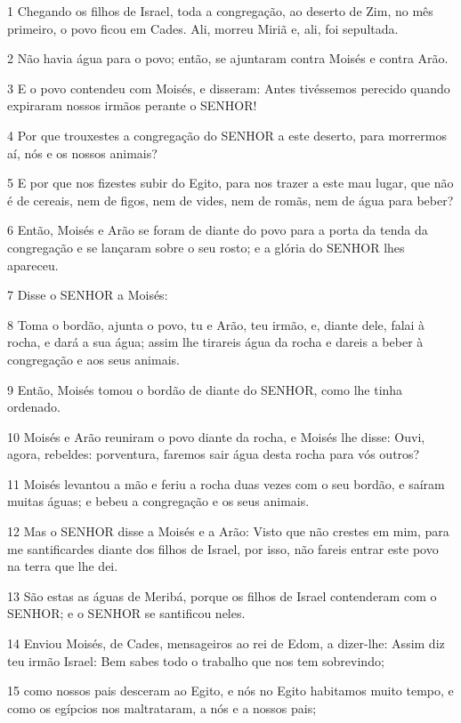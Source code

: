 \par 1 Chegando os filhos de Israel, toda a congregação, ao deserto de Zim, no mês primeiro, o povo ficou em Cades. Ali, morreu Miriã e, ali, foi sepultada.
\par 2 Não havia água para o povo; então, se ajuntaram contra Moisés e contra Arão.
\par 3 E o povo contendeu com Moisés, e disseram: Antes tivéssemos perecido quando expiraram nossos irmãos perante o SENHOR!
\par 4 Por que trouxestes a congregação do SENHOR a este deserto, para morrermos aí, nós e os nossos animais?
\par 5 E por que nos fizestes subir do Egito, para nos trazer a este mau lugar, que não é de cereais, nem de figos, nem de vides, nem de romãs, nem de água para beber?
\par 6 Então, Moisés e Arão se foram de diante do povo para a porta da tenda da congregação e se lançaram sobre o seu rosto; e a glória do SENHOR lhes apareceu.
\par 7 Disse o SENHOR a Moisés:
\par 8 Toma o bordão, ajunta o povo, tu e Arão, teu irmão, e, diante dele, falai à rocha, e dará a sua água; assim lhe tirareis água da rocha e dareis a beber à congregação e aos seus animais.
\par 9 Então, Moisés tomou o bordão de diante do SENHOR, como lhe tinha ordenado.
\par 10 Moisés e Arão reuniram o povo diante da rocha, e Moisés lhe disse: Ouvi, agora, rebeldes: porventura, faremos sair água desta rocha para vós outros?
\par 11 Moisés levantou a mão e feriu a rocha duas vezes com o seu bordão, e saíram muitas águas; e bebeu a congregação e os seus animais.
\par 12 Mas o SENHOR disse a Moisés e a Arão: Visto que não crestes em mim, para me santificardes diante dos filhos de Israel, por isso, não fareis entrar este povo na terra que lhe dei.
\par 13 São estas as águas de Meribá, porque os filhos de Israel contenderam com o SENHOR; e o SENHOR se santificou neles.
\par 14 Enviou Moisés, de Cades, mensageiros ao rei de Edom, a dizer-lhe: Assim diz teu irmão Israel: Bem sabes todo o trabalho que nos tem sobrevindo;
\par 15 como nossos pais desceram ao Egito, e nós no Egito habitamos muito tempo, e como os egípcios nos maltrataram, a nós e a nossos pais;
